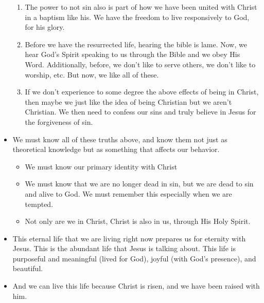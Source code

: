 \begin{itemize}
{\begin{enumerate}
    \item{The power to not sin also is part of how we have been united with Christ in a baptism like his. We have the freedom to live responsively to God, for his glory.}
    \item{Before we have the resurrected life, hearing the bible is lame. Now, we hear God’s Spirit speaking to us through the Bible and we obey His Word. Additionally, before, we don’t like to serve others, we don’t like to worship, etc. But now, we like all of these.}
    \item{If we don’t experience to some degree the above effects of being in Christ, then maybe we just like the idea of being Christian but we aren’t Christian. We then need to confess our sins and truly believe in Jesus for the forgiveness of sin.}
  \end{enumerate}}
  \item{We must know all of these truths above, and know them not just as theoretical knowledge but as something that affects our behavior. 
  \begin{itemize}
    \item{We must know our primary identity with Christ}
    \item{We must know that we are no longer dead in sin, but we are dead to sin and alive to God. We must remember this especially when we are tempted.}
    \item{Not only are we in Christ, Christ is also in us, through His Holy Spirit.}
  \end{itemize}
  }
  \item{This eternal life that we are living right now prepares us for eternity with Jesus. This is the abundant life that Jesus is talking about. This life is purposeful and meaningful (lived for God), joyful (with God’s presence), and beautiful.}
  \item{And we can live this life because Christ is risen, and we have been raised with him.}
\end{itemize}
